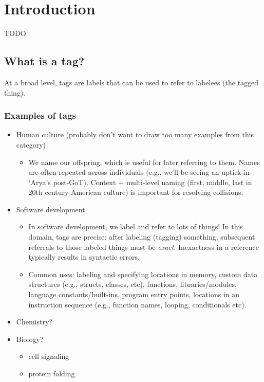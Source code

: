 \section{Introduction}

TODO \citep{taylor2016open}

\subsection{What is a tag?}

At a broad level, tags are labels that can be used to refer to labelees (the
tagged thing).

\subsubsection{Examples of tags}

\begin{itemize}
  \item Human culture (probably don't want to draw too many examples from this category)
    \begin{itemize}
      \item We name our offspring, which is useful for later referring to them.
            Names are often repeated across individuals (e.g., we'll be seeing an
            uptick in `Arya's post-GoT). Context + multi-level naming (first, middle,
            last in 20th century American culture) is important for resolving collisions.
    \end{itemize}
  \item Software development
    \begin{itemize}
      \item In software development, we label and refer to lots of things! In this
            domain, tags are precise: after labeling (tagging) something, subsequent
            referrals to those labeled things must be \textit{exact}. Inexactness
            in a reference typically results in syntactic errors.
      \item Common uses: labeling and specifying locations in memory, custom data
            structures (e.g., structs, classes, etc), functions, libraries/modules,
            language constants/built-ins, program entry points, locations in an
            instruction sequence (e.g., function names, looping, conditionals etc).
    \end{itemize}
  \item Chemistry?
  \item Biology?
    \begin{itemize}
      \item cell signaling
      \item protein folding
    \end{itemize}
\end{itemize}

